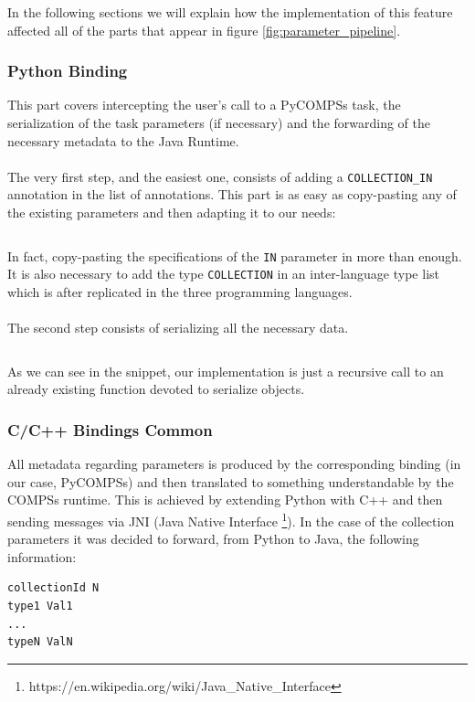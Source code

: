 In the following sections we will explain how the implementation of this feature affected all of the parts that appear in figure \ref{fig:parameter_pipeline}.

\subsubsection{Python Binding}
\label{subsubsec:python_binding_col_in}
This part covers intercepting the user's call to a PyCOMPSs task, the serialization of the task parameters (if necessary) and the forwarding of the necessary metadata to the Java Runtime.\\
\\
The very first step, and the easiest one, consists of adding a \verb|COLLECTION_IN| annotation in the list of annotations. This part is as easy as copy-pasting any of the existing parameters and then adapting it to our needs:

\inputminted{python}{snippets/param_col_in.py}

In fact, copy-pasting the specifications of the \verb|IN| parameter in more than enough. It is also necessary to add the type \verb|COLLECTION| in an inter-language type list which is after replicated in the three programming languages.\\
\\
The second step consists of serializing all the necessary data.

\inputminted{python}{snippets/serialize_object_into_file.py}

As we can see in the snippet, our implementation is just a recursive call to an already existing function devoted to serialize objects.

\subsubsection{C/C++ Bindings Common}
\label{subsubsec:bindings_common_col_in}
All metadata regarding parameters is produced by the corresponding binding (in our case, PyCOMPSs) and then translated to something understandable by the COMPSs runtime. This is achieved by extending Python with C++ and then sending messages via JNI (Java Native Interface \footnote{https://en.wikipedia.org/wiki/Java\_Native\_Interface}). In the case of the collection parameters it was decided to forward, from Python to Java, the following information:

\begin{verbatim}
collectionId N
type1 Val1
...
typeN ValN
\end{verbatim}

